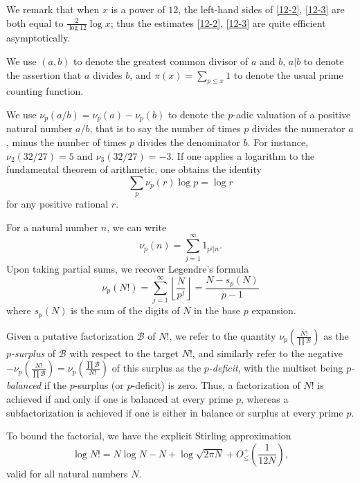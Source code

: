 \documentclass[12pt,a4paper,reqno]{amsart}
\numberwithin{equation}{section}
\theoremstyle{plain}
\theoremstyle{definition}
\newcommand\tuple{{\mathcal B}}
\begin{document}
We remark that when $x$ is a power of $12$, the left-hand sides of \eqref{12-2}, \eqref{12-3} are both equal to $\frac{2}{\log 12} \log x$; thus the estimates \eqref{12-2}, \eqref{12-3} are quite efficient asymptotically.

We use $(a,b)$ to denote the greatest common divisor of $a$ and $b$, $a|b$ to denote the assertion that $a$ divides $b$, and $\pi(x) = \sum_{p \leq x} 1$ to denote the usual prime counting function.

We use $\nu_p(a/b) = \nu_p(a)-\nu_p(b)$ to denote the $p$-adic valuation of a positive natural number $a/b$, that is to say the number of times $p$ divides the numerator $a$, minus the number of times $p$ divides the denominator $b$.  For instance, $\nu_2(32/27)=5$ and $\nu_3(32/27)=-3$. 
If one applies a logarithm to the fundamental theorem of arithmetic, one obtains the identity
\begin{equation}\label{ftoa}
  \sum_p \nu_p(r) \log p = \log r
\end{equation}
for any positive rational $r$.  

For a natural number $n$, we can write
\begin{equation}\label{nup-form} 
  \nu_p(n) = \sum_{j=1}^\infty 1_{p^j|n}.
\end{equation}
Upon taking partial sums, we recover Legendre's formula
\begin{equation}\label{legendre}
  \nu_p(N!) = \sum_{j=1}^\infty \left\lfloor \frac{N}{p^j} \right\rfloor = \frac{N - s_p(N)}{p-1}
\end{equation}
where $s_p(N)$ is the sum of the digits of $N$ in the base $p$ expansion.

Given a putative factorization $\tuple$ of $N!$,  
we refer to the quantity $\nu_p\left( \frac{N!}{\prod \tuple} \right)$ as the \emph{$p$-surplus} of $\tuple$ with respect to the target $N!$, and similarly refer to the negative $-\nu_p\left( \frac{N!}{\prod \tuple} \right) = \nu_p\left( \frac{\prod \tuple}{N!} \right)$ of this surplus as the \emph{$p$-deficit}, with the multiset being \emph{$p$-balanced} if the $p$-surplus (or $p$-deficit) is zero.  Thus, a factorization of $N!$ is achieved if and only if one is balanced at every prime $p$, whereas a subfactorization is achieved if one is either in balance or surplus at every prime $p$.

To bound the factorial, we have the explicit Stirling approximation \cite{robbins}
\begin{equation}\label{stirling}
\log N! = N \log N - N + \log \sqrt{2\pi N} + O_\leq^+\left(\frac{1}{12N}\right),
\end{equation}
valid for all natural numbers $N$. 
\end{document}
